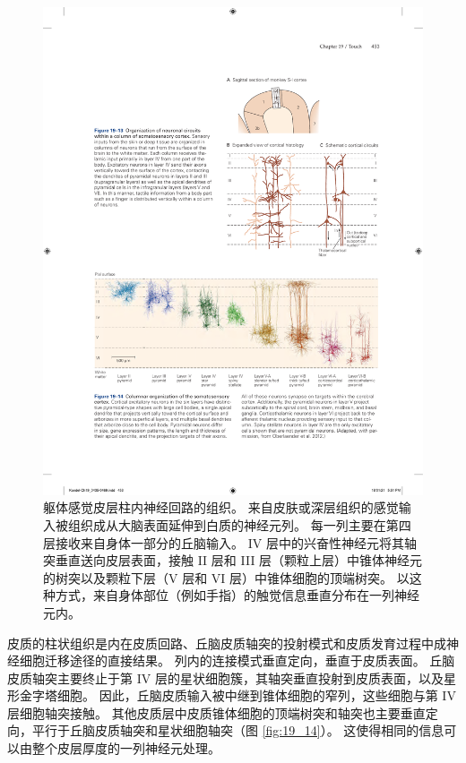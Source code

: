 \begin{figure}[htbp]
	\centering
	\includegraphics[width=0.5\linewidth]{chap19/fig_19_13}
	\caption{躯体感觉皮层柱内神经回路的组织。 
		来自皮肤或深层组织的感觉输入被组织成从大脑表面延伸到白质的神经元列。 
		每一列主要在第四层接收来自身体一部分的丘脑输入。 
		IV 层中的兴奋性神经元将其轴突垂直送向皮层表面，接触 II 层和 III 层（颗粒上层）中锥体神经元的树突以及颗粒下层（V 层和 VI 层）中锥体细胞的顶端树突。 
		以这种方式，来自身体部位（例如手指）的触觉信息垂直分布在一列神经元内。}
	\label{fig:19_13}
\end{figure}

皮质的柱状组织是内在皮质回路、丘脑皮质轴突的投射模式和皮质发育过程中成神经细胞迁移途径的直接结果。 
列内的连接模式垂直定向，垂直于皮质表面。 
丘脑皮质轴突主要终止于第 IV 层的星状细胞簇，其轴突垂直投射到皮质表面，以及星形金字塔细胞。 
因此，丘脑皮质输入被中继到锥体细胞的窄列，这些细胞与第 IV 层细胞轴突接触。 
其他皮质层中皮质锥体细胞的顶端树突和轴突也主要垂直定向，平行于丘脑皮质轴突和星状细胞轴突（图 \ref{fig:19_14}）。 
这使得相同的信息可以由整个皮层厚度的一列神经元处理。

